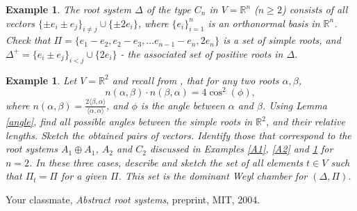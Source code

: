 \documentclass[11pt]{amsart}
\newcommand{\R}{\mathbb R}
\newcommand{\la}{\langle}
\newcommand{\ra}{\rangle}
\newtheorem{example}[theorem]{Example}
\begin{document}
\begin{example} \label{Cn}
The root system $\Delta$ 
of the type $C_n$ in $V=\R^n$ ($n \geq 2$) consists 
of all vectors $\{ \pm e_i \pm e_j\}_{i \neq j} \cup \{ \pm 2e_i \}$, 
where $\{e_i\}_{i=1}^n$ is an orthonormal basis in $\R^n$. Check that 
  $\Pi = \{ e_1 - e_2, e_2 - e_3, \ldots e_{n-1} -e_n, 2e_n \}$ is 
a set of simple roots, and $\Delta^+ = \{ e_i \pm e_j\}_{i<j}\cup \{2e_i\}$ 
- the associated set of positive roots in $\Delta$.   
\end{example} 

  
\begin{example} Let $V= \R^2$ and recall from \cite{1}, that for 
any two roots $\alpha, \beta$, 
$$ n(\alpha, \beta) \cdot n(\beta, \alpha) = 4 \cos^2(\phi),$$ 
where $n(\alpha, \beta) = 
\frac{2\la \beta, \alpha\ra}{\la \alpha, \alpha \ra }$, and 
$\phi$ is the angle between $\alpha$ and $\beta$.  Using Lemma 
\ref{angle}, find all possible angles between the simple roots in $\R^2$, 
and their relative lengths. Sketch the obtained pairs of vectors. 
Identify those that correspond to the root systems $A_1 \oplus A_1$, 
$A_2$ and $C_2$ discussed in Examples \ref{A1}, \ref{A2} and \ref{Cn} 
for $n=2$. In these three 
cases, describe and sketch the set of all elements 
$t \in V$ such that $\Pi_t = \Pi$ for a given $\Pi$. This set is the 
dominant Weyl chamber for $(\Delta, \Pi)$.  
\end{example}


\begin{thebibliography}{2}

 Your classmate, {\it Abstract root systems}, 
preprint, MIT, 2004. 


\end{thebibliography}
\end{document}
